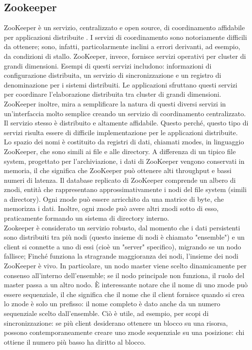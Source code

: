 \subsection{Zookeeper}
\label{sec:zookeeper}
ZooKeeper è un servizio, centralizzato e open source, di coordinamento affidabile per applicazioni distribuite \cite{zookeeper:home}. I servizi di coordinamento sono notoriamente difficili da ottenere; sono, infatti, particolarmente inclini a errori derivanti, ad esempio, da condizioni di stallo. ZooKeeper, invece, fornisce servizi operativi per cluster di grandi dimensioni. Esempi di questi servizi includono: informazioni di configurazione distribuita, un servizio di sincronizzazione e un registro di denominazione per i sistemi distribuiti. Le applicazioni sfruttano questi servizi per coordinare l'elaborazione distribuita tra cluster di grandi dimensioni. ZooKeeper inoltre, mira a semplificare la natura di questi diversi servizi in un'interfaccia molto semplice creando un servizio di coordinamento centralizzato. Il servizio stesso è distribuito e altamente affidabile. Questo perché, questo tipo di servizi risulta essere di difficile implementazione per le applicazioni distribuite.
\\Lo spazio dei nomi è costituito da registri di dati, chiamati znodes, in linguaggio ZooKeeper, che sono simili ai file e alle directory. A differenza di un tipico file system, progettato per l'archiviazione, i dati di ZooKeeper vengono conservati in memoria, il che significa che ZooKeeper può ottenere alti throughput e bassi numeri di latenza. Il database replicato di ZooKeeper comprende un albero di znodi, entità che rappresentano approssimativamente i nodi del file system (simili a directory). Ogni znode può essere arricchito da una matrice di byte, che memorizza i dati. Inoltre, ogni znode può avere altri znodi sotto di esso, praticamente formando un sistema di directory interno.
\\Zookeeper è considerato un servizio robusto, dal momento che i dati persistenti sono distribuiti tra più nodi (questo insieme di nodi è chiamato "ensemble") e un client si connette a uno di essi (cioè un "server" specifico), migrando se un nodo fallisce; Finché funziona la stragrande maggioranza dei nodi, l'insieme dei nodi ZooKeeper è vivo. In particolare, un nodo master viene scelto dinamicamente per consenso all'interno dell'ensemble; se il nodo principale non funziona, il ruolo del master passa a un altro nodo. È interessante notare che il nome di uno znode può essere sequenziale, il che significa che il nome che il client fornisce quando si crea lo znode è solo un prefisso: il nome completo è dato anche da un numero sequenziale scelto dall'ensemble. Ciò è utile, ad esempio, per scopi di sincronizzazione: se più client desiderano ottenere un blocco su una risorsa, possono contemporaneamente creare uno znode sequenziale su una posizione: chi ottiene il numero più basso ha diritto al blocco.
